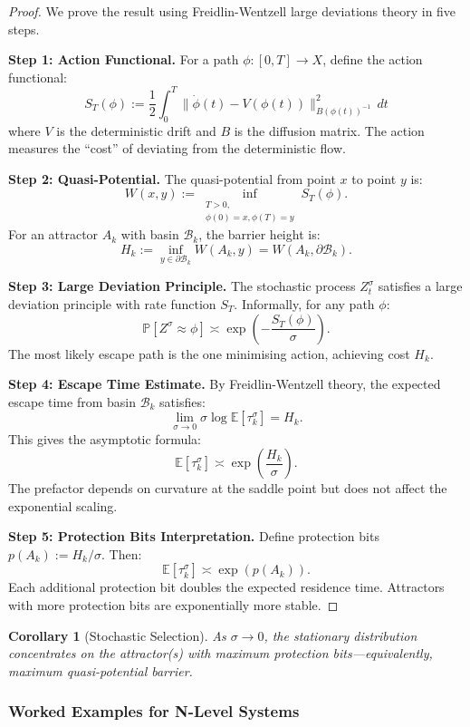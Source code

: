 \documentclass[12pt]{article}
\newtheorem{corollary}[theorem]{Corollary}
\newcommand{\E}{\mathbb{E}}
\begin{document}
\begin{proof}
We prove the result using Freidlin-Wentzell large deviations theory in five steps.

\textbf{Step 1: Action Functional.}
For a path $\phi: [0, T] \to X$, define the action functional:
\[
S_T(\phi) := \frac{1}{2} \int_0^T \|\dot{\phi}(t) - V(\phi(t))\|_{B(\phi(t))^{-1}}^2 \, dt
\]
where $V$ is the deterministic drift and $B$ is the diffusion matrix. The action measures the ``cost'' of deviating from the deterministic flow.

\textbf{Step 2: Quasi-Potential.}
The quasi-potential from point $x$ to point $y$ is:
\[
W(x, y) := \inf_{\substack{T > 0, \\ \phi(0) = x, \phi(T) = y}} S_T(\phi).
\]
For an attractor $A_k$ with basin $\mathcal{B}_k$, the barrier height is:
\[
H_k := \inf_{y \in \partial \mathcal{B}_k} W(A_k, y) = W(A_k, \partial \mathcal{B}_k).
\]

\textbf{Step 3: Large Deviation Principle.}
The stochastic process $Z_t^\sigma$ satisfies a large deviation principle with rate function $S_T$. Informally, for any path $\phi$:
\[
\mathbb{P}\left[ Z^\sigma \approx \phi \right] \asymp \exp\left( -\frac{S_T(\phi)}{\sigma} \right).
\]
The most likely escape path is the one minimising action, achieving cost $H_k$.

\textbf{Step 4: Escape Time Estimate.}
By Freidlin-Wentzell theory, the expected escape time from basin $\mathcal{B}_k$ satisfies:
\[
\lim_{\sigma \to 0} \sigma \log \E[\tau_k^\sigma] = H_k.
\]
This gives the asymptotic formula:
\[
\E[\tau_k^\sigma] \asymp \exp\left( \frac{H_k}{\sigma} \right).
\]
The prefactor depends on curvature at the saddle point but does not affect the exponential scaling.

\textbf{Step 5: Protection Bits Interpretation.}
Define protection bits $p(A_k) := H_k / \sigma$. Then:
\[
\E[\tau_k^\sigma] \asymp \exp(p(A_k)).
\]
Each additional protection bit doubles the expected residence time. Attractors with more protection bits are exponentially more stable.
\end{proof}

\begin{corollary}[Stochastic Selection]
As $\sigma \to 0$, the stationary distribution concentrates on the attractor(s) with maximum protection bits---equivalently, maximum quasi-potential barrier.
\end{corollary}

\subsubsection{Worked Examples for N-Level Systems}
\end{document}
